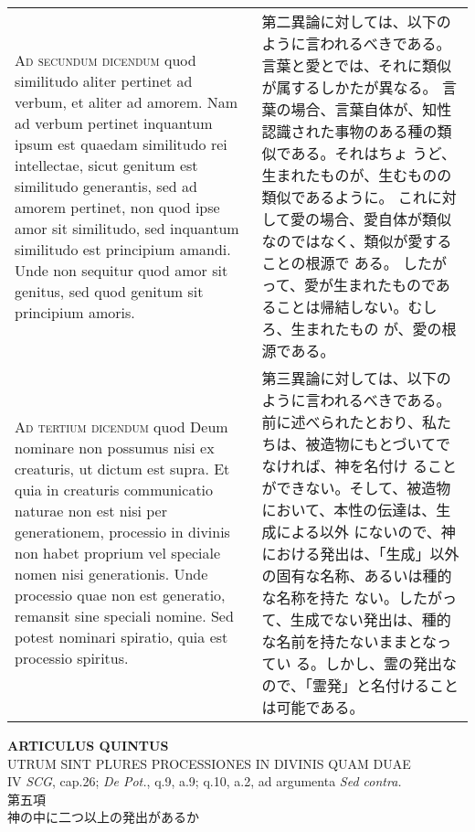 \documentclass[10pt]{jsarticle} %
\begin{document}
\begin{longtable}{p{21em}p{21em}}
\\



{\scshape Ad secundum dicendum} quod similitudo aliter pertinet ad
 verbum, et aliter ad amorem. Nam ad verbum pertinet inquantum ipsum est
 quaedam similitudo rei intellectae, sicut genitum est similitudo
 generantis, sed ad amorem pertinet, non quod ipse amor sit similitudo,
 sed inquantum similitudo est principium amandi. Unde non sequitur quod
 amor sit genitus, sed quod genitum sit principium amoris.



&


第二異論に対しては、以下のように言われるべきである。
言葉と愛とでは、それに類似が属するしかたが異なる。
言葉の場合、言葉自体が、知性認識された事物のある種の類似である。それはちょ
 うど、生まれたものが、生むものの類似であるように。
これに対して愛の場合、愛自体が類似なのではなく、類似が愛することの根源で
 ある。
したがって、愛が生まれたものであることは帰結しない。むしろ、生まれたもの
 が、愛の根源である。


\\



{\scshape Ad tertium dicendum} quod Deum nominare non possumus nisi ex
 creaturis, ut dictum est supra. Et quia in creaturis communicatio
 naturae non est nisi per generationem, processio in divinis non habet
 proprium vel speciale nomen nisi generationis. Unde processio quae non
 est generatio, remansit sine speciali nomine. Sed potest nominari
 spiratio, quia est processio spiritus.



&


第三異論に対しては、以下のように言われるべきである。
前に述べられたとおり、私たちは、被造物にもとづいてでなければ、神を名付け
 ることができない。そして、被造物において、本性の伝達は、生成による以外
 にないので、神における発出は、「生成」以外の固有な名称、あるいは種的な名称を持た
 ない。したがって、生成でない発出は、種的な名前を持たないままとなってい
 る。しかし、霊の発出なので、「霊発」と名付けることは可能である。




\end{longtable}
\newpage



\begin{center}
 {\Large {\bf ARTICULUS QUINTUS}}\\
 {\large UTRUM SINT PLURES PROCESSIONES IN DIVINIS QUAM DUAE}\\
 {\footnotesize IV {\itshape SCG}, cap.26; {\itshape De Pot.}, q.9, a.9;
 q.10, a.2, ad argumenta {\itshape Sed contra.}}\\
 {\Large 第五項\\神の中に二つ以上の発出があるか}
\end{center}
\end{document}
